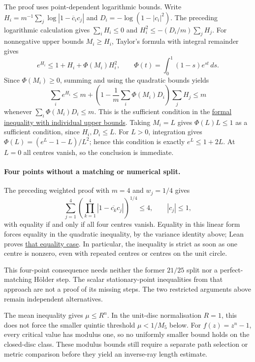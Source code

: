 The proof uses point-dependent logarithmic bounds. Write
$H_i=m^{-1}\sum_j\log|1-\overline c_i c_j|$ and
$D_i=-\log(1-|c_i|^2)$. The preceding logarithmic calculation gives
$\sum_iH_i\le0$ and $H_i^2\le-(D_i/m)\sum_jH_j$.
For nonnegative upper bounds $M_i\ge H_i$, Taylor's formula with
integral remainder gives
\[
 e^{H_i}\le1+H_i+\Phi(M_i)H_i^2,
 \qquad \Phi(t)=\int_0^1(1-s)e^{st}\,ds.
\]
Since $\Phi(M_i)\ge0$, summing and using the quadratic bounds yields
\[
 \sum_i e^{H_i}
 \le m+\left(1-\frac1m\sum_i\Phi(M_i)D_i\right)\sum_jH_j
 \le m
\]
whenever $\sum_i\Phi(M_i)D_i\le m$. This is the sufficient condition
in the
\href{https://github.com/wcook04/plectis-erdos/blob/0d34630e1cc9d2b1ac6edfa7cfdba83b31bdc8fe/ErdosProblems/Erdos1041/LogKernelCentralCertificate.lean#L99}{formal inequality with individual upper bounds}.
Taking $M_i=L$ gives $\Phi(L)L\le1$ as a sufficient condition,
since $H_i,D_i\le L$. For $L>0$, integration gives
$\Phi(L)=(e^L-1-L)/L^2$; hence this condition is exactly
$e^L\le1+2L$. At $L=0$ all centres vanish, so the conclusion is
immediate.

\paragraph{Four points without a matching or numerical split.}
The preceding weighted proof with $m=4$ and $w_j=1/4$ gives
\[
 \sum_{j=1}^4\left(\prod_{k=1}^4|1-\overline{c_k}c_j|\right)^{1/4}\le4,
 \qquad |c_j|\le1,
\]
with equality if and only if all four centres vanish. Equality in this
linear form forces equality in the quadratic inequality, by the variance
identity above; Lean proves
\href{https://github.com/wcook04/plectis-erdos/blob/e6c2d8f77ac24753c5216a49f4daf7f7388b309f/lean/ErdosProblems/Erdos1041/PaperWeightedRefinementsR10.lean\#L17-L21}{that equality case}.
In particular, the
inequality is strict as soon as one centre is nonzero, even with repeated
centres or centres on the unit circle.

This four-point consequence needs neither the former $21/25$ split
nor a perfect-matching H\"older step. The scalar stationary-point
inequalities from that approach are not a proof of its missing steps.
The two restricted arguments above remain independent alternatives.

The mean inequality gives $\mu\le R^n$. In the unit-disc normalisation
$R=1$, this does not force the smaller quintic threshold $\mu<1/M_5$
below. For $f(z)=z^n-1$, every critical value has modulus one, so no
uniformly smaller bound holds on the closed-disc class. These modulus bounds still require a separate path selection or
metric comparison before they yield an inverse-ray length estimate.

